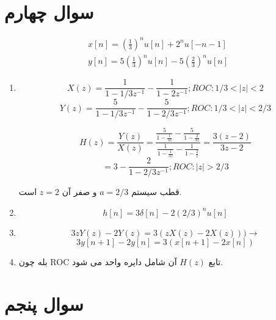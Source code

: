 \documentclass[12pt]{article}
\begin{document}
\section{سوال چهارم}
$$
\begin{array}{l}
	x[n]=\left(\frac{1}{3}\right)^{n} u[n]+2^{n} u[-n-1] \\
	y[n]=5\left(\frac{1}{3}\right)^{n} u[n]-5\left(\frac{2}{3}\right)^{n} u[n]
\end{array}
$$



\begin{enumerate}[label = \Alph*)]
	\item 

$$X(z) = \frac{1}{1-1/3 z^{-1}} - \frac{1}{1- 2 z^{-1}} ; ROC: 1/3<|z|<2$$
$$Y(z)= \frac{5}{1 - 1/3 z^{-1}} - \frac{5}{1 - 2/3 z^{-1}} ; ROC: 1/3 < |z| <2/3$$

$$H(z) = \frac{Y(z)}{X(z)} =\frac{\frac{5}{1-\frac{1}{3 z}}-\frac{5}{1-\frac{2}{3 z}}}{\frac{1}{1-\frac{1}{3 z}}-\frac{1}{1-\frac{2}{z}}} =\frac{3 (z-2)}{3 z-2}$$
$$=3 - \frac{2}{1 - 2/3 z^{-1}} ; ROC: |z| > 2/3  $$


قطب سیستم $a = 2/3$ و صفر آن $z=2$ است.


\item
$$h[n] = 3\delta[n] - 2 (2/3)^n u[n]$$


\item

$$3z Y(z) -2 Y(z) = 3(zX(z) - 2 X(z))) \rightarrow$$
$$3 y[n+1] - 2y[n] = 3(x[n+1] - 2x[n])$$

\item

بله چون ROC تابع $H(z)$ آن شامل دایره واحد می شود.
\end{enumerate}

\section{سوال پنجم}
\end{document}
